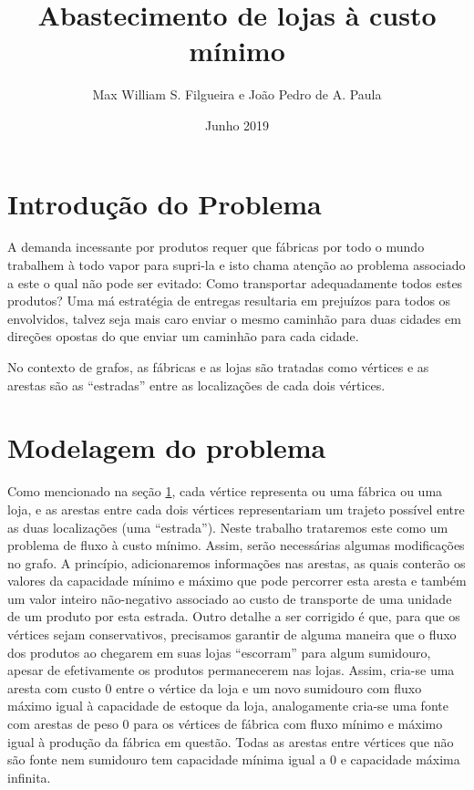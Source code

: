 \documentclass[12pt,a4]{article}
\title{Abastecimento de lojas à custo mínimo}
\author{Max William S. Filgueira e João Pedro de A. Paula}
\date{Junho 2019}
\begin{document}
\maketitle

\tableofcontents

\newpage

\section{Introdução do Problema}
\label{sec:intro}

A demanda incessante por produtos requer que fábricas por todo o mundo trabalhem
à todo vapor para supri-la e isto chama atenção ao problema associado a este o
qual não pode ser evitado: Como transportar adequadamente todos estes produtos?
Uma má estratégia de entregas resultaria em prejuízos para todos os envolvidos,
talvez seja mais caro enviar o mesmo caminhão para duas cidades em direções
opostas do que enviar um caminhão para cada cidade.

No contexto de grafos, as fábricas e as lojas são tratadas como vértices e as
arestas são as ``estradas'' entre as localizações de cada dois vértices.

\section{Modelagem do problema}
\label{sec:modelling}

Como mencionado na seção \ref{sec:intro}, cada vértice representa ou uma fábrica
ou uma loja, e as arestas entre cada dois vértices representariam um trajeto
possível entre as duas localizações (uma ``estrada''). Neste trabalho trataremos
este como um problema de fluxo à custo mínimo. Assim, serão necessárias algumas
modificações no grafo. A princípio, adicionaremos informações nas arestas, as
quais conterão os valores da capacidade mínimo e máximo que pode percorrer esta
aresta e também um valor inteiro não-negativo associado ao custo de transporte
de uma unidade de um produto por esta estrada. Outro detalhe a ser corrigido é
que, para que os vértices sejam conservativos, precisamos garantir de alguma
maneira que o fluxo dos produtos ao chegarem em suas lojas ``escorram'' para
algum sumidouro, apesar de efetivamente os produtos permanecerem nas lojas.
Assim, cria-se uma aresta com custo 0 entre o vértice da loja e um novo
sumidouro com fluxo máximo igual à capacidade de estoque da loja, analogamente
cria-se uma fonte com arestas de peso 0 para os vértices de fábrica com fluxo
mínimo e máximo igual à produção da fábrica em questão. Todas as arestas entre
vértices que não são fonte nem sumidouro tem capacidade mínima igual a 0 e
capacidade máxima infinita.
\end{document}
